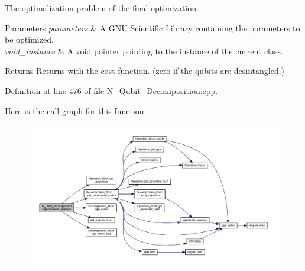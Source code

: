 The optimalization problem of the final optimization. 


\begin{DoxyParams}{Parameters}
{\em parameters} & A G\+NU Scientific Library containing the parameters to be optimized. \\
\hline
{\em void\+\_\+instance} & A void pointer pointing to the instance of the current class. \\
\hline
\end{DoxyParams}
\begin{DoxyReturn}{Returns}
Returns with the cost function. (zero if the qubits are desintangled.) 
\end{DoxyReturn}


Definition at line 476 of file N\+\_\+\+Qubit\+\_\+\+Decomposition.\+cpp.



Here is the call graph for this function\+:
\nopagebreak
\begin{figure}[H]
\begin{center}
\leavevmode
\includegraphics[width=350pt]{class_n___qubit___decomposition_a8494fcf34e2896b9272def3b0fd36f0b_cgraph}
\end{center}
\end{figure}


